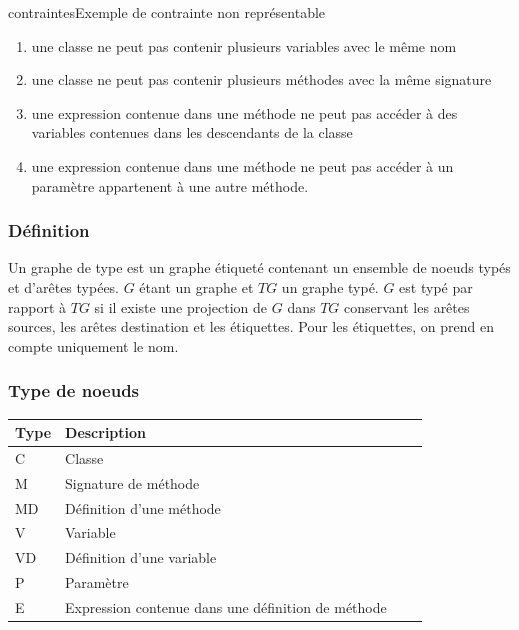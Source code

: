 \documentclass[a4paper, 12pt]{article}
\begin{document}
  \begin{myfig}{contraintes}{Exemple de contrainte non représentable}
    \begin{enumerate}
      \item {\scriptsize une classe ne peut pas contenir plusieurs variables avec le même nom}
      \item {\scriptsize une classe ne peut pas contenir plusieurs méthodes avec la même signature}
      \item {\scriptsize une expression contenue dans une méthode ne peut pas accéder à des variables contenues dans les descendants de la classe}
      \item {\scriptsize une expression contenue dans une méthode ne peut pas accéder à un paramètre appartenent à une autre méthode.}
    \end{enumerate}
  \end{myfig}

  \subsubsection{Définition}
  Un graphe de type est un graphe étiqueté contenant un ensemble de noeuds typés et d'arêtes typées. \(G\) étant un graphe et \(TG\) un graphe typé. \(G\) est typé par rapport à \(TG\) si il existe une projection
  de \(G\) dans \(TG\) conservant les arêtes sources, les arêtes destination et les étiquettes. Pour les étiquettes, on prend en compte uniquement le nom.

  \subsubsection{Type de noeuds}

  \begin{tabular}{ | l | l | l | p{5cm} |}
    \hline
    Type & Description  \\ \hline
    C & Classe   \\ \hline
    M & Signature de méthode   \\ \hline
    MD &  Définition d'une méthode   \\ \hline
    V &  Variable   \\ \hline
    VD &  Définition d'une variable \\ \hline
    P & Paramètre \\ \hline
    E &  Expression contenue dans une définition de méthode \\ \hline
  \end{tabular}
\end{document}
